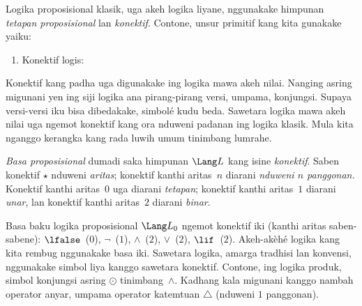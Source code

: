 \documentclass[../../../include/open-logic-section]{subfiles}
\begin{document}


Logika proposisional klasik, uga akeh logika liyane, nggunakake
himpunan \emph{tetapan proposisional} lan \emph{konektif}.
Contone, unsur primitif kang kita gunakake yaiku:
\begin{enumerate}
\item Konektif logis:
  \startycommalist
\end{enumerate}

Konektif kang padha uga digunakake ing logika mawa akeh nilai.
Nanging asring migunani yen ing siji logika ana pirang-pirang
versi, umpama, konjungsi. Supaya versi-versi iku bisa dibedakake,
simbolé kudu beda. Sawetara logika mawa akeh nilai uga ngemot
konektif kang ora nduweni padanan ing logika klasik. Mula kita
nganggo kerangka kang rada luwih umum tinimbang lumrahe.

\begin{defn}
  \emph{Basa proposisional} dumadi saka himpunan $\Lang L$
  kang isine \emph{konektif}. Saben konektif $\star$ nduweni
  \emph{aritas}; konektif kanthi aritas~$n$ diarani
  \emph{nduweni $n$ panggonan.}
  Konektif kanthi aritas~$0$ uga diarani \emph{tetapan};
  konektif kanthi aritas~$1$ diarani \emph{unar}, lan
  konektif kanthi aritas~$2$ diarani \emph{binar}.
\end{defn}

\begin{ex}
  Basa baku logika proposisional $\Lang L_0$ ngemot
  konektif iki (kanthi aritas saben-sabene):
  $\lfalse$~($0$),
  $\lnot$~($1$),
  $\land$~($2$),
  $\lor$~($2$),
  $\lif$~($2$). Akeh-akèhé logika kang kita rembug
  nggunakake basa iki. Sawetara logika, amarga tradhisi lan
  konvensi, nggunakake simbol liya kanggo sawetara konektif.
  Contone, ing logika produk, simbol konjungsi asring
  $\odot$ tinimbang~$\land$. Kadhang kala migunani kanggo
  nambah operator anyar, umpama operator katemtuan $\triangle$
  (nduweni $1$ panggonan).
\end{ex}
\end{document}
